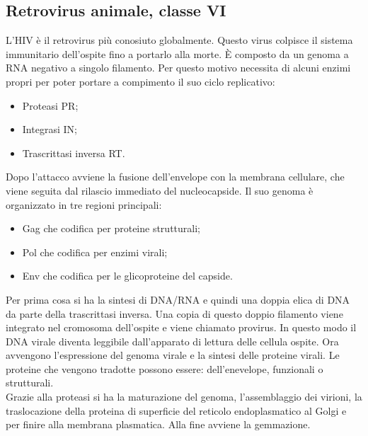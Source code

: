 \subsection{Retrovirus animale, classe VI}
L'HIV \`e il retrovirus pi\`u conosiuto globalmente. Questo virus colpisce il sistema immunitario dell'ospite fino a portarlo alla morte. \`E composto da un genoma a RNA negativo a singolo filamento. Per questo motivo necessita di alcuni enzimi propri per poter portare a compimento il suo ciclo replicativo: 
\begin{itemize}
    \item Proteasi PR; 
    \item Integrasi IN; 
    \item Trascrittasi inversa RT.
\end{itemize}
Dopo l'attacco avviene la fusione dell'envelope con la membrana cellulare, che viene seguita dal rilascio immediato del nucleocapside. Il suo genoma \`e organizzato in tre regioni principali:
\begin{itemize}
    \item Gag che codifica per proteine strutturali; 
    \item Pol che codifica per enzimi virali; 
    \item Env che codifica per le glicoproteine del capside. 
\end{itemize}
Per prima cosa si ha la sintesi di DNA/RNA e quindi una doppia elica di DNA da parte della trascrittasi inversa. Una copia di questo doppio filamento viene integrato nel cromosoma dell'ospite e viene chiamato provirus. In questo modo il DNA virale diventa leggibile dall'apparato di lettura delle cellula ospite. Ora avvengono l'espressione del genoma virale e la sintesi delle proteine virali. Le proteine che vengono tradotte possono essere: dell'enevelope, funzionali o strutturali. 
\\Grazie alla proteasi si ha la maturazione del genoma, l'assemblaggio dei virioni, la traslocazione della proteina di superficie del reticolo endoplasmatico al Golgi e per finire alla membrana plasmatica. Alla fine avviene la gemmazione. 
